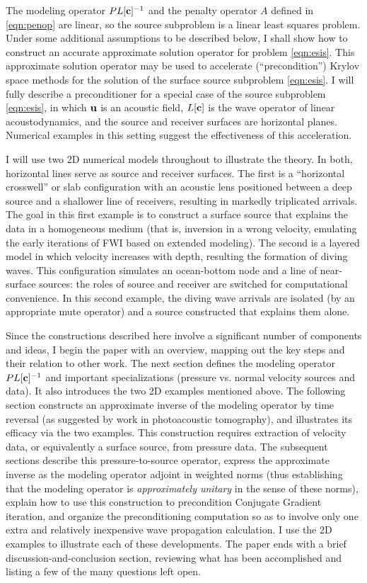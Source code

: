 \documentclass[georeport,12pt]{geophysics}
\begin{document}
The modeling operator $PL[{\bf c}]^{-1}$ and the penalty operator $A$ defined in \ref{eqn:penop} are linear, so the source
subproblem is a linear least squares problem. Under some additional
assumptions to be described below, I shall show how to construct an
accurate approximate solution operator for problem
\ref{eqn:esis}. This approximate solution operator may be used to
accelerate (``precondition'') Krylov space methods for the solution of the surface source
subproblem \ref{eqn:esis}. I will fully describe a preconditioner for a special
case of the source subproblem \ref{eqn:esis}, in which ${\bf u}$ is an
acoustic field, $L[{\bf c}]$ is the wave operator of linear
acoustodynamics, and the source and receiver surfaces are horizontal
planes. Numerical examples in this setting suggest the
effectiveness of this acceleration.

I will use two 2D numerical models 
throughout to illustrate the theory. In both, horizontal lines serve as
source and receiver surfaces. The first is a ``horizontal crosswell'' or slab
configuration with an acoustic lens positioned between a deep source
and a shallower line of 
receivers, resulting in markedly triplicated arrivals. The goal in
this first example is to construct a surface source that explains the data in a
homogeneous medium (that is, inversion in a wrong velocity, emulating
the early iterations of FWI based on extended modeling). The second is a layered
model in which velocity increases with depth, resulting the formation
of diving waves. This configuration simulates an
ocean-bottom node and a line of near-surface sources: the roles of
source and receiver are switched for computational convenience. In
this second example, the diving wave arrivals are isolated (by an
appropriate mute operator) and a
source constructed that explains them alone.

Since the constructions described here involve a significant number of
components and ideas, I begin the paper with an overview, mapping out
the key steps and their relation to other work.
The next section defines the modeling operator $PL[{\bf c}]^{-1}$ and important specializations (pressure vs. normal velocity
sources and data). It also introduces the two 2D examples mentioned
above.  The following section constructs an approximate inverse of the
modeling operator by time reversal (as suggested by work in
photoacoustic tomography), and illustrates its efficacy via the two
examples. This construction requires extraction of
velocity data, or equivalently a surface source, from pressure data.
The subsequent sections describe this pressure-to-source operator,
express the approximate inverse as the modeling operator adjoint in
weighted norms (thus establishing that the modeling operator is {\em
  approximately unitary} in the sense of these norms), explain how to
use this construction to precondition Conjugate Gradient iteration,
and organize the preconditioning computation so as to involve only one
extra and relatively inexpensive wave propagation calculation. I use
the 2D examples to illustrate each of
these developments. The paper ends with a brief
discussion-and-conclusion section, reviewing what has been
accomplished and listing a few of the many questions left open.
\end{document}
